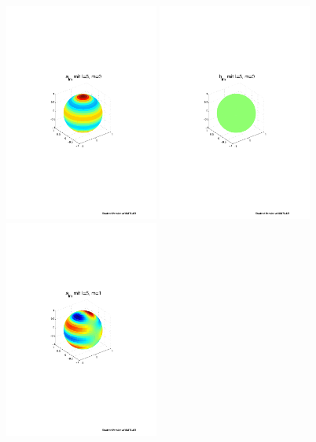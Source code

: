 \begin{refsection}
\begin{figure}%
\centering
\includegraphics[width=0.45\textwidth]{kugel/ylm/a_5_0.pdf}
\includegraphics[width=0.45\textwidth]{kugel/ylm/b_5_0.pdf}
\includegraphics[width=0.45\textwidth]{kugel/ylm/a_5_1.pdf}

\end{figure}
\end{refsection}
